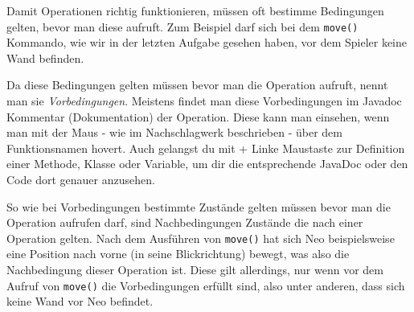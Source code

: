 \begin{Infobox}
    Damit Operationen richtig funktionieren, müssen oft bestimme Bedingungen gelten, bevor man diese aufruft.
    Zum Beispiel darf sich bei dem \lstinline{move()} Kommando, wie wir in der letzten Aufgabe gesehen haben, vor dem Spieler keine Wand befinden.\newline

    Da diese Bedingungen gelten müssen bevor man die Operation aufruft, nennt man sie \textit{Vorbedingungen}.
    Meistens findet man diese Vorbedingungen im Javadoc Kommentar (Dokumentation) der Operation.
    Diese kann man einsehen, wenn man mit der Maus - wie im Nachschlagwerk beschrieben - über dem Funktionsnamen hovert.
    Auch gelangst du mit  + Linke Maustaste zur Definition einer Methode, Klasse oder Variable, um dir die entsprechende JavaDoc oder den Code dort genauer anzusehen.\newline

    So wie bei Vorbedingungen bestimmte Zustände gelten müssen bevor man die Operation aufrufen darf, sind Nachbedingungen Zustände die nach einer Operation gelten.
    Nach dem Ausführen von \lstinline{move()} hat sich Neo beispielsweise eine Position nach vorne (in seine Blickrichtung) bewegt, was also die Nachbedingung dieser Operation ist.
    Diese gilt allerdings, nur wenn vor dem Aufruf von \lstinline{move()} die Vorbedingungen erfüllt sind, also unter anderen, dass sich keine Wand vor Neo befindet.


\end{Infobox}
